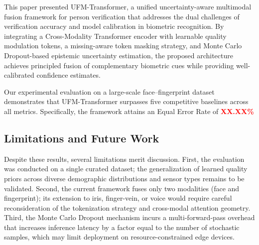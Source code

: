 \documentclass[10pt,journal,compsoc]{IEEEtran}
\begin{document}
This paper presented UFM-Transformer, a unified uncertainty-aware multimodal fusion framework for person verification that addresses the dual challenges of verification accuracy and model calibration in biometric recognition. By integrating a Cross-Modality Transformer encoder with learnable quality modulation tokens, a missing-aware token masking strategy, and Monte Carlo Dropout-based epistemic uncertainty estimation, the proposed architecture achieves principled fusion of complementary biometric cues while providing well-calibrated confidence estimates.

Our experimental evaluation on a large-scale face--fingerprint dataset demonstrates that UFM-Transformer surpasses five competitive baselines across all metrics. Specifically, the framework attains an Equal Error Rate of \textcolor{red}{\textbf{XX.XX\%}} %

\subsection{Limitations and Future Work}

Despite these results, several limitations merit discussion. First, the evaluation was conducted on a single curated dataset; the generalization of learned quality priors across diverse demographic distributions and sensor types remains to be validated. Second, the current framework fuses only two modalities (face and fingerprint); its extension to iris, finger-vein, or voice would require careful reconsideration of the tokenization strategy and cross-modal attention geometry. Third, the Monte Carlo Dropout mechanism incurs a multi-forward-pass overhead that increases inference latency by a factor equal to the number of stochastic samples, which may limit deployment on resource-constrained edge devices.
\end{document}
